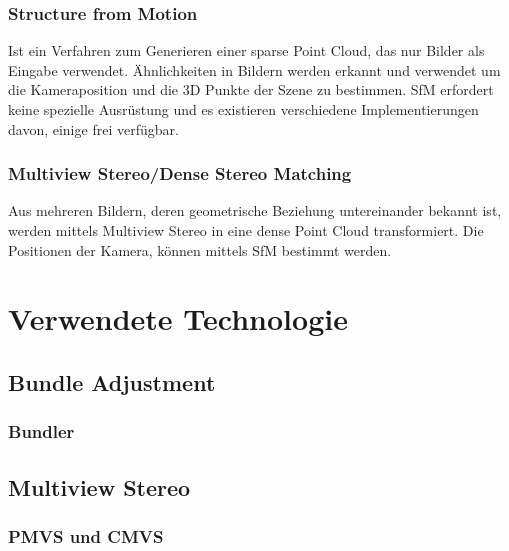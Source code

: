 \documentclass{paper}
\begin{document}
		\subsubsection{Structure from Motion}
			Ist ein Verfahren zum Generieren einer sparse Point Cloud, das nur Bilder als Eingabe verwendet.
			Ähnlichkeiten in Bildern werden erkannt und verwendet um die Kameraposition und die 3D Punkte der Szene zu bestimmen.
			SfM erfordert keine spezielle Ausrüstung und es existieren verschiedene Implementierungen davon, einige frei verfügbar.
		
		\subsubsection{Multiview Stereo/Dense Stereo Matching}\label{mvs}
			Aus mehreren Bildern, deren geometrische Beziehung untereinander bekannt ist, werden mittels Multiview Stereo in eine dense Point Cloud transformiert. Die Positionen der Kamera, können mittels SfM bestimmt werden.
			
	\section{Verwendete Technologie} \label{tech}
		\subsection{Bundle Adjustment}
		
			\subsubsection{Bundler}
			
		\subsection{Multiview Stereo}
			\subsubsection{PMVS und CMVS}
			
		
			
				
\end{document}
